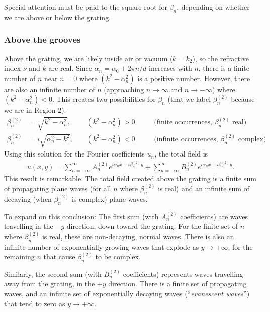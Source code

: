Special attention must be paid to the square root for $\beta_n$, depending on whether we are above or below the grating.

\subsubsection{Above the grooves}
  Above the grating, we are likely inside air or vacuum ($k=k_2$), so the refractive index $\nu$ and $k$ are real.  Since $\alpha_n = \alpha_0 + 2\pi n/d$ increases with $n$, there is a finite number of $n$ near $n=0$ where $(k^2 - \alpha_n^2)$ is a positive number.  However, there are also an infinite number of $n$ (approaching $n\rightarrow \infty$ and $n\rightarrow -\infty$) where $(k^2 - \alpha_n^2) < 0$.  This creates two possibilities for $\beta_n$ (that we label $\beta^{(2)}_n$ because we are in Region 2):
\begin{align}
\beta^{(2)}_n &= \sqrt{k^2 - \alpha_n^2} ,\;\;\;\; & (k^2-\alpha_n^2)>0 \;\;\;\; &&\textrm{(finite occurrences, } \beta^{(2)}_n\textrm{ real)} \\
\beta^{(2)}_n &= i\sqrt{\alpha_n^2 - k^2}, \;\;\;\; & (k^2-\alpha_n^2)<0 \;\;\;\; &&\textrm{(infinite occurrences, } \beta^{(2)}_n\textrm{ complex)}
\end{align}
Using this solution for the Fourier coefficients $u_n$, the total field is
\begin{align}
u(x,y) =  \sum_{n=-\infty}^{\infty} A^{(2)}_n e^{i \alpha_n x - i \beta^{(2)}_n y} +  \sum_{n=-\infty}^{\infty} B^{(2)}_n e^{i \alpha_n x + i \beta^{(2)}_n y}.
\end{align}
This result is remarkable.  The total field created above the grating is a finite sum of propagating plane waves (for all $n$ where $\beta^{(2)}_n$ is real) and an infinite sum of decaying (when $\beta^{(2)}_n$ is complex) plane waves.

To expand on this conclusion: The first sum (with $A^{(2)}_n$ coefficients) are waves travelling in the $-y$ direction, down toward the grating.  For the finite set of $n$ where $\beta^{(2)}_n$ is real, these are non-decaying, normal waves.  There is also  an infinite number of exponentially growing waves that explode as $y\rightarrow +\infty$, for the remaining $n$ that cause $\beta^{(2)}_n$ to be complex.

Similarly, the second sum (with $B^{(2)}_n$ coefficients) represents waves travelling away from the grating, in the $+y$ direction.  There is a finite set of propagating waves, and an infinite set of exponentially decaying waves (``\emph{evanescent waves}'') that tend to zero as $y \rightarrow +\infty$.  

